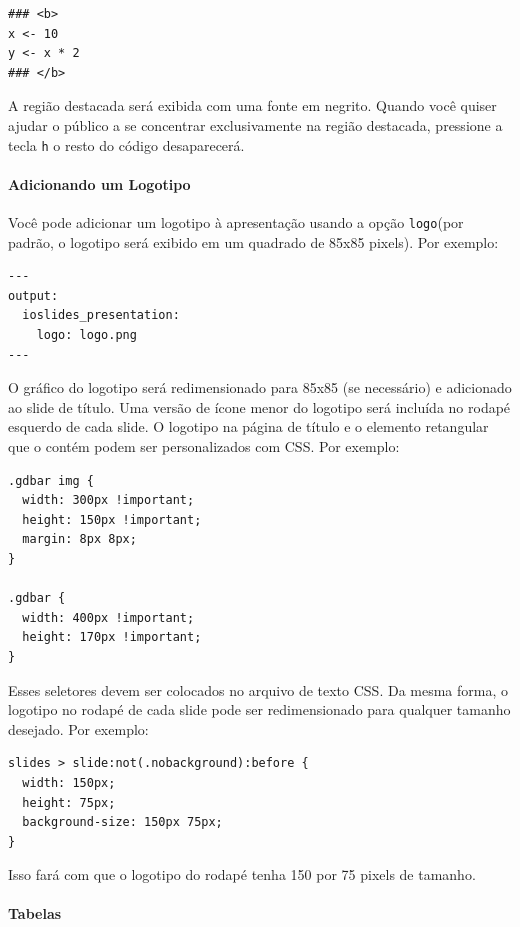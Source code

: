 \documentclass[
]{book}
\begin{document}
\begin{verbatim}
### <b>
x <- 10
y <- x * 2
### </b>
\end{verbatim}

A região destacada será exibida com uma fonte em negrito. Quando você quiser ajudar o público a se concentrar exclusivamente na região destacada, pressione a tecla \texttt{h} o resto do código desaparecerá.

\hypertarget{adicionando-um-logotipo}{%
\paragraph{Adicionando um Logotipo}\label{adicionando-um-logotipo}}

Você pode adicionar um logotipo à apresentação usando a opção \texttt{logo}(por padrão, o logotipo será exibido em um quadrado de 85x85 pixels). Por exemplo:

\begin{verbatim}
---
output:
  ioslides_presentation:
    logo: logo.png
---
\end{verbatim}

O gráfico do logotipo será redimensionado para 85x85 (se necessário) e adicionado ao slide de título. Uma versão de ícone menor do logotipo será incluída no rodapé esquerdo de cada slide.
O logotipo na página de título e o elemento retangular que o contém podem ser personalizados com CSS. Por exemplo:

\begin{verbatim}
.gdbar img {
  width: 300px !important;
  height: 150px !important;
  margin: 8px 8px;
}

.gdbar {
  width: 400px !important;
  height: 170px !important;
}
\end{verbatim}

Esses seletores devem ser colocados no arquivo de texto CSS.
Da mesma forma, o logotipo no rodapé de cada slide pode ser redimensionado para qualquer tamanho desejado. Por exemplo:

\begin{verbatim}
slides > slide:not(.nobackground):before {
  width: 150px;
  height: 75px;
  background-size: 150px 75px;
}
\end{verbatim}

Isso fará com que o logotipo do rodapé tenha 150 por 75 pixels de tamanho.

\hypertarget{tabelas}{%
\paragraph{Tabelas}\label{tabelas}}
\end{document}
